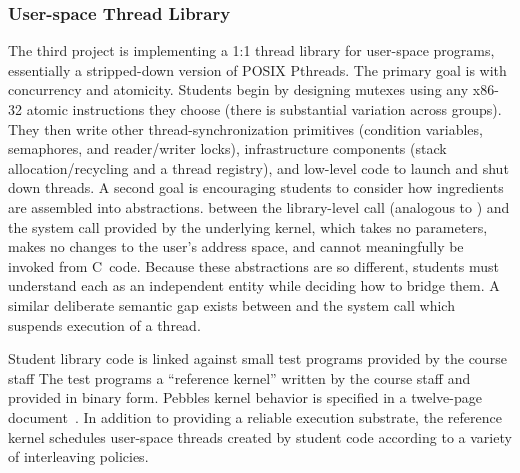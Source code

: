 \subsubsection{User-space Thread Library}
The third project is implementing a 1:1 thread library for
user-space programs,
essentially a stripped-down
version of POSIX Pthreads.
The primary goal is
with concurrency and atomicity.
Students begin by designing mutexes using any
x86-32 atomic instructions they choose
(there is substantial variation across groups).
They then write other thread-synchronization
primitives (condition variables, semaphores,
and reader/writer locks), infrastructure
components (stack allocation/recycling and
a thread registry),
and low-level code to launch and shut down
threads.
A second goal is encouraging students to
consider how ingredients are assembled into
abstractions.
between the library-level 
call (analogous to )
and the  system call provided
by the underlying kernel,
which takes no parameters,
makes no changes to the user's address space,
and cannot meaningfully
be invoked from C~code.
Because these abstractions are so different,
students must
understand each as an independent entity while
deciding how to bridge them.
A similar deliberate semantic gap exists between
 and the system call
which suspends execution of a thread.

Student library code is linked against small
test programs provided by the course staff
The test programs  a ``reference kernel'' written by
the course staff
and provided in binary form.
%
Pebbles kernel behavior is specified
in a twelve-page document~\cite{kspec}.
In addition to providing a reliable execution
substrate,
the reference kernel schedules
 user-space threads created by
student code according to a variety of
interleaving policies.

